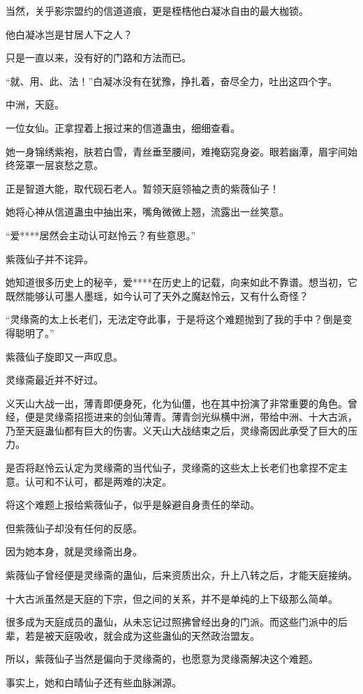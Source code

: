\begin{this_body}
当然，关乎影宗盟约的信道道痕，更是桎梏他白凝冰自由的最大枷锁。

他白凝冰岂是甘居人下之人？

只是一直以来，没有好的门路和方法而已。

“就、用、此、法！”白凝冰没有在犹豫，挣扎着，奋尽全力，吐出这四个字。

中洲，天庭。

一位女仙。正拿捏着上报过来的信道蛊虫，细细查看。

她一身锦绣紫袍，肤若白雪，青丝垂至腰间，难掩窈窕身姿。眼若幽潭，眉宇间始终笼罩一层哀愁之意。

正是智道大能，取代砚石老人。暂领天庭领袖之责的紫薇仙子！

她将心神从信道蛊虫中抽出来，嘴角微微上翘，流露出一丝笑意。

“爱****居然会主动认可赵怜云？有些意思。”

紫薇仙子并不诧异。

她知道很多历史上的秘辛，爱****在历史上的记载，向来如此不靠谱。想当初，它既然能够认可墨人墨瑶，如今认可了天外之魔赵怜云，又有什么奇怪？

“灵缘斋的太上长老们，无法定夺此事，于是将这个难题抛到了我的手中？倒是变得聪明了。”

紫薇仙子旋即又一声叹息。

灵缘斋最近并不好过。

义天山大战一出，薄青即便身死，化为仙僵，也在其中扮演了非常重要的角色。曾经，便是灵缘斋招揽进来的剑仙薄青。薄青剑光纵横中洲，带给中洲、十大古派，乃至天庭蛊仙都有巨大的伤害。义天山大战结束之后，灵缘斋因此承受了巨大的压力。

是否将赵怜云认定为灵缘斋的当代仙子，灵缘斋的这些太上长老们也拿捏不定主意。认可和不认可，都是两难的决定。

将这个难题上报给紫薇仙子，似乎是躲避自身责任的举动。

但紫薇仙子却没有任何的反感。

因为她本身，就是灵缘斋出身。

紫薇仙子曾经便是灵缘斋的蛊仙，后来资质出众，升上八转之后，才能天庭接纳。

十大古派虽然是天庭的下宗，但之间的关系，并不是单纯的上下级那么简单。

很多成为天庭成员的蛊仙，从未忘记过照拂曾经出身的门派。而这些门派中的后辈，若是被天庭吸收，就会成为这些蛊仙的天然政治盟友。

所以，紫薇仙子当然是偏向于灵缘斋的，也愿意为灵缘斋解决这个难题。

事实上，她和白晴仙子还有些血脉渊源。


\end{this_body}
